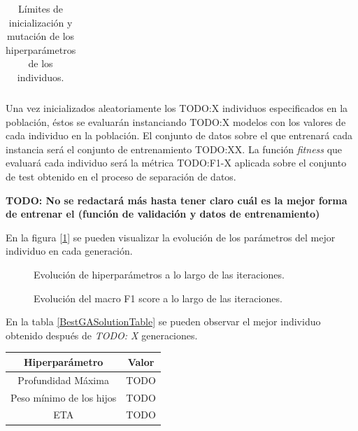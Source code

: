 \begin{enumerate}
\begin{table}[H]
\begin{tabular}{ |c|c|c| }
                    \end{tabular}

                \caption{Límites de inicialización y mutación de los hiperparámetros de los individuos.}
                \label{InitAndMutationLimitsHyperparamsTable}
            \end{table}

            Una vez inicializados aleatoriamente los TODO:X individuos especificados en la población, éstos se evaluarán instanciando TODO:X modelos con los valores de cada individuo en la población. El conjunto de datos sobre el que entrenará cada instancia  será el conjunto de entrenamiento TODO:XX. La función \textit{fitness} que evaluará cada individuo será la métrica TODO:F1-X aplicada sobre el conjunto de test obtenido en el proceso de separación de datos.

            \textbf{TODO: No se redactará más hasta tener claro cuál es la mejor forma de entrenar el  (función de validación y datos de entrenamiento)}

            En la figura [\ref{EvolucionHiperparametrosImage}] se pueden visualizar la evolución de los parámetros del mejor individuo en cada generación.

            \begin{figure}[H]
                \centering
                
                \caption{Evolución de hiperparámetros a lo largo de las iteraciones.}
                \label{EvolucionHiperparametrosImage}
             \end{figure}

            \begin{figure}[H]
                \centering
                
                \caption{Evolución del macro F1 score a lo largo de las iteraciones.}
                \label{EvolucionF1ScoreImage}
             \end{figure}
             
            En la tabla \ref{BestGASolutionTable} se pueden observar el mejor individuo obtenido después de \textit{TODO: X} generaciones.

            \begin{table}[H]
                \centering
                    \begin{tabular}{ |c|c| } 
                        \hline
                        \textbf{Hiperparámetro} & \textbf{Valor}\\
                        \hline
                            Profundidad Máxima & TODO \\ 
                            Peso mínimo de los hijos & TODO \\ 
                            ETA & TODO \\ 
                        \hline


\end{tabular}
\end{table}
\end{enumerate}
